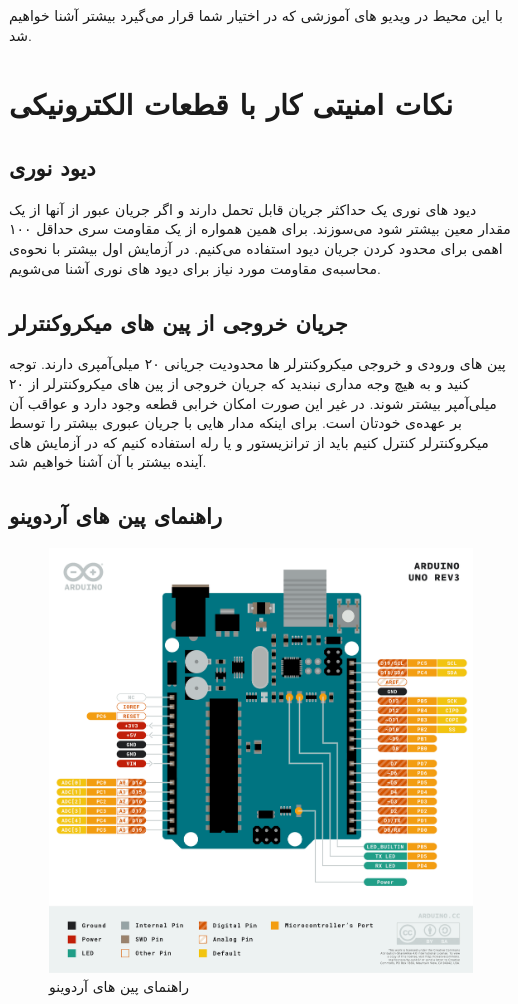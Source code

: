 با این محیط در ویدیو های آموزشی که در اختیار شما قرار می‌گیرد بیشتر آشنا خواهیم شد.

\section{نکات امنیتی کار با قطعات الکترونیکی}

\subsection{دیود نوری}
دیود های نوری یک حداکثر جریان قابل تحمل دارند و اگر جریان عبور از آنها از یک مقدار معین بیشتر شود می‌سوزند. برای همین همواره از یک مقاومت سری حداقل ۱۰۰ اهمی برای محدود کردن جریان دیود استفاده می‌کنیم. در آزمایش اول بیشتر با نحوه‌ی محاسبه‌ی مقاومت مورد نیاز برای دیود های نوری آشنا می‌شویم.

\subsection{جریان خروجی از پین های میکروکنترلر}

پین های ورودی و خروجی میکروکنترلر ها محدودیت جریانی ۲۰ میلی‌آمپری دارند. توجه کنید و به هیچ وجه مداری نبندید که جریان خروجی از پین های میکروکنترلر از ۲۰ میلی‌آمپر بیشتر شوند. در غیر این صورت امکان خرابی قطعه وجود دارد و عواقب آن بر عهده‌ی خودتان است. برای اینکه مدار هایی با جریان عبوری بیشتر را توسط میکروکنترلر کنترل کنیم باید از ترانزیستور و یا رله استفاده کنیم که در آزمایش های آینده بیشتر با آن آشنا خواهیم شد.

\subsection{راهنمای پین های آردوینو}
\begin{figure}[h]
    \centering
    \includegraphics[width=16cm]{Pinout-UNO.png}
    \caption{راهنمای پین های آردوینو}
    \label{fig:ard_pinout}
\end{figure}

\